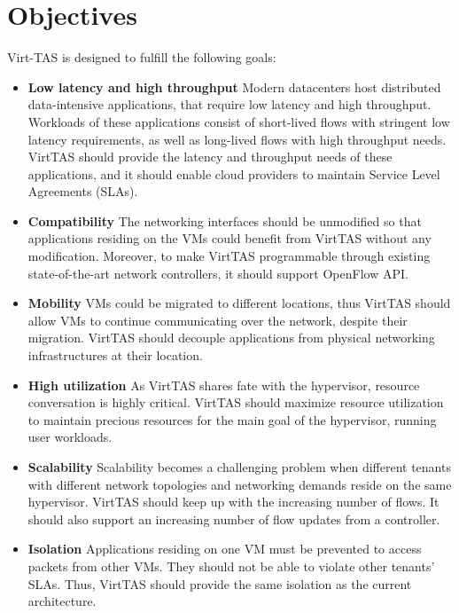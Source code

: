 
\section{Objectives}
Virt-TAS is designed to fulfill the following goals:

\begin{itemize}
    \item \textbf{Low latency and high throughput} %
    Modern datacenters host distributed data-intensive applications, that require 
    low latency and high throughput. Workloads of these applications consist of short-lived 
    flows with stringent low latency requirements, as well as long-lived flows with 
    high throughput needs. VirtTAS should provide the latency and throughput needs 
    of these applications, and it should enable cloud providers to maintain Service 
    Level Agreements (SLAs). 
    
    \item \textbf{Compatibility} %
    The networking interfaces should be unmodified so that applications residing on 
    the VMs could benefit from VirtTAS without any modification.
    Moreover, to make VirtTAS programmable through existing state-of-the-art network controllers,
    it should support OpenFlow API.

    \item \textbf{Mobility} %
    VMs could be migrated to different locations, thus VirtTAS should allow VMs to continue 
    communicating over the network, despite their migration. VirtTAS should decouple applications 
    from physical networking infrastructures at their location.

    \item \textbf{High utilization}
    As VirtTAS shares fate with the hypervisor, resource conversation is highly critical. 
    VirtTAS should maximize resource utilization to maintain precious resources for the 
    main goal of the hypervisor, running user workloads.

    \item \textbf{Scalability} %
    Scalability becomes a challenging problem when different tenants with different network 
    topologies and networking demands reside on the same hypervisor. VirtTAS should keep up 
    with the increasing number of flows. It should also support an increasing number of flow 
    updates from a controller.

    \item \textbf{Isolation} 
    Applications residing on one VM must be prevented to access packets from other VMs. 
    They should not be able to violate other tenants' SLAs. Thus, VirtTAS should provide 
    the same isolation as the current architecture.

\end{itemize}

